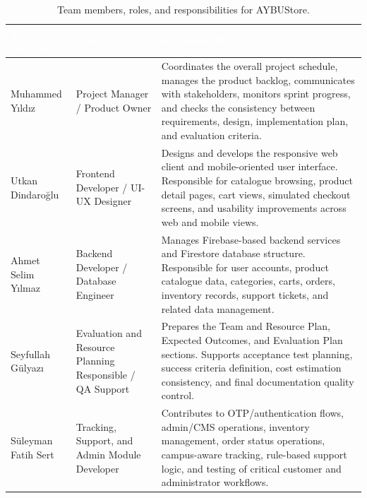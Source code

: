 \documentclass[11pt,a4paper]{article}
\begin{document}
\renewcommand{\arraystretch}{1.25}
\begin{table}[H]
\centering
\small
\begin{tabularx}{\textwidth}{|p{}|p{}|X|}
\hline
\rowcolor{aybuHeader}
\textcolor{white}{\textbf{Team Member}} &
\textcolor{white}{\textbf{Role}} &
\textcolor{white}{\textbf{Responsibilities}} \\ \hline

Muhammed Yıldız &
Project Manager / Product Owner &
Coordinates the overall project schedule, manages the product backlog,
communicates with stakeholders, monitors sprint progress, and checks the
consistency between requirements, design, implementation plan, and
evaluation criteria. \\ \hline

Utkan Dindaroğlu &
Frontend Developer / UI-UX Designer &
Designs and develops the responsive web client and mobile-oriented user
interface. Responsible for catalogue browsing, product detail pages, cart
views, simulated checkout screens, and usability improvements across web
and mobile views. \\ \hline

Ahmet Selim Yılmaz &
Backend Developer / Database Engineer &
Manages Firebase-based backend services and Firestore database structure.
Responsible for user accounts, product catalogue data, categories, carts,
orders, inventory records, support tickets, and related data management. \\ \hline

Seyfullah Gülyazı &
Evaluation and Resource Planning Responsible / QA Support &
Prepares the Team and Resource Plan, Expected Outcomes, and Evaluation
Plan sections. Supports acceptance test planning, success criteria
definition, cost estimation consistency, and final documentation quality
control. \\ \hline

Süleyman Fatih Sert &
Tracking, Support, and Admin Module Developer &
Contributes to OTP/authentication flows, admin/CMS operations, inventory
management, order status operations, campus-aware tracking, rule-based
support logic, and testing of critical customer and administrator workflows. \\ \hline

\end{tabularx}
\caption{Team members, roles, and responsibilities for AYBUStore.}
\label{tab:team-roles}
\end{table}
\end{document}
